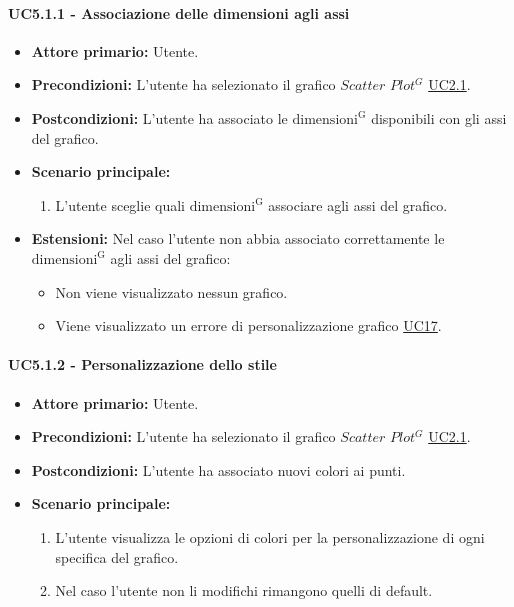 \paragraph{UC5.1.1 - Associazione delle dimensioni agli assi}
\label{sec:UC5.1.1}
    \begin{itemize}
        \item \textbf{Attore primario:} Utente.
        \item \textbf{Precondizioni:} L'utente ha selezionato il grafico $Scatter$ $Plot^{G}$ \hyperref[sec:UC2.1]{UC2.1}.
	    \item \textbf{Postcondizioni:} L'utente ha associato le ${\mathrm{dimensioni^{G}}}$ disponibili con gli assi del grafico.
	    \item \textbf{Scenario principale:} 
	    \begin{enumerate}
	    		\item L'utente sceglie quali ${\mathrm{dimensioni^{G}}}$ associare agli assi del grafico.
		\end{enumerate}
	    \item \textbf{Estensioni:} Nel caso l'utente non abbia associato correttamente le ${\mathrm{dimensioni^{G}}}$ agli assi del grafico:
              \begin{itemize}
                  \item Non viene visualizzato nessun grafico.
                  \item Viene visualizzato un errore di personalizzazione grafico \hyperref[sec:UC17 - Errore di personalizzazione]{UC17}.
              \end{itemize}
    \end{itemize}
\paragraph{UC5.1.2 - Personalizzazione dello stile}
\label{sec:UC5.1.2}
    \begin{itemize}
        \item \textbf{Attore primario:} Utente.
        \item \textbf{Precondizioni:} L'utente ha selezionato il grafico $Scatter$ $Plot^{G}$ \hyperref[sec:UC2.1]{UC2.1}.
	    \item \textbf{Postcondizioni:} L'utente ha associato nuovi colori ai punti.
	    \item \textbf{Scenario principale:} 
	    \begin{enumerate}
	    		\item L'utente visualizza le opzioni di colori per la personalizzazione di ogni specifica del grafico.
	    		\item Nel caso l'utente non li modifichi rimangono quelli di default.
		\end{enumerate}
    \end{itemize}

